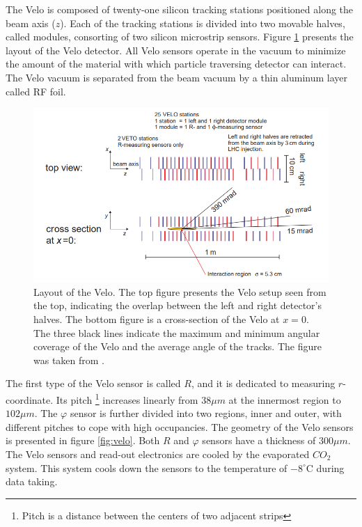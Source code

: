 The Velo is composed of twenty-one silicon tracking stations positioned along the beam axis ($z$). Each of the tracking stations is divided into two movable halves, called modules, consorting of two silicon microstrip sensors. Figure \ref{fig:veloLayout} presents the layout of the Velo detector. All Velo sensors operate in the vacuum to minimize the amount of the material with which particle traversing detector can interact. The Velo vacuum is separated from the beam vacuum by a thin aluminum layer called RF foil.   


\begin{figure}[h]
\centering
\includegraphics{figures/VeloLayout.png}
\caption{Layout of the Velo. The top figure presents the Velo setup seen from the top, indicating the overlap between the left and right detector's halves. The bottom figure is a cross-section of the Velo at $x=0$. The three black lines indicate the maximum and minimum angular coverage of the Velo and the average angle of the tracks. The figure was taken from \cite{VELO}. 
\label{fig:veloLayout}}
\end{figure}


The first type of the Velo sensor is called $R$, and it is dedicated to measuring $r$-coordinate. Its pitch \footnote{Pitch is a distance between the centers of two adjacent strips} increases linearly from $38\mu m$ at the innermost region to $102 \mu m$. The  $\varphi$ sensor is further divided into two regions, inner and outer, with different pitches to cope with high occupancies. The geometry of the Velo sensors is presented in figure \ref{fig:velo}. Both $R$ and $\varphi$ sensors have a thickness of $300 \mu m$. The Velo sensors and read-out electronics are cooled by the evaporated $CO_2$ system. This system cools down the sensors to the temperature of $-8^\circ$C during data taking.  


